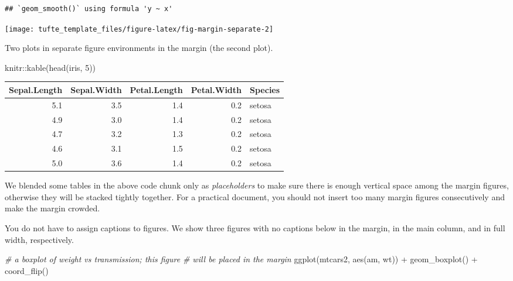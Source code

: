 \documentclass[a4paper,14pt]{tufte-handout}
\newenvironment{Shaded}{}{}
\newcommand{\CommentTok}[1]{\textcolor[rgb]{0.38,0.63,0.69}{\textit{#1}}}
\newcommand{\DecValTok}[1]{\textcolor[rgb]{0.25,0.63,0.44}{#1}}
\newcommand{\FunctionTok}[1]{\textcolor[rgb]{0.02,0.16,0.49}{#1}}
\newcommand{\NormalTok}[1]{#1}
\newcommand{\SpecialCharTok}[1]{\textcolor[rgb]{0.25,0.44,0.63}{#1}}
\begin{document}
\begin{verbatim}
## `geom_smooth()` using formula 'y ~ x'
\end{verbatim}

\begin{marginfigure}

{\centering \texttt{[image: tufte\_template\_files/figure-latex/fig-margin-separate-2]} 

}

\caption[Two plots in separate figure environments in the margin (the second plot)]{Two plots in separate figure environments in the margin (the second plot).}\label{fig:fig-margin-separate-2}
\end{marginfigure}

\begin{Shaded}
\begin{Highlighting}[numbers=left,,]
\NormalTok{knitr}\SpecialCharTok{::}\FunctionTok{kable}\NormalTok{(}\FunctionTok{head}\NormalTok{(iris, }\DecValTok{5}\NormalTok{))}
\end{Highlighting}
\end{Shaded}

\begin{tabular}{r|r|r|r|l}
\hline
Sepal.Length & Sepal.Width & Petal.Length & Petal.Width & Species\\
\hline
5.1 & 3.5 & 1.4 & 0.2 & setosa\\
\hline
4.9 & 3.0 & 1.4 & 0.2 & setosa\\
\hline
4.7 & 3.2 & 1.3 & 0.2 & setosa\\
\hline
4.6 & 3.1 & 1.5 & 0.2 & setosa\\
\hline
5.0 & 3.6 & 1.4 & 0.2 & setosa\\
\hline
\end{tabular}

We blended some tables in the above code chunk only as
\emph{placeholders} to make sure there is enough vertical space among
the margin figures, otherwise they will be stacked tightly together. For
a practical document, you should not insert too many margin figures
consecutively and make the margin crowded.

You do not have to assign captions to figures. We show three figures
with no captions below in the margin, in the main column, and in full
width, respectively.

\begin{Shaded}
\begin{Highlighting}[numbers=left,,]
\CommentTok{\# a boxplot of weight vs transmission; this figure}
\CommentTok{\# will be placed in the margin}
\FunctionTok{ggplot}\NormalTok{(mtcars2, }\FunctionTok{aes}\NormalTok{(am, wt)) }\SpecialCharTok{+} \FunctionTok{geom\_boxplot}\NormalTok{() }\SpecialCharTok{+}
  \FunctionTok{coord\_flip}\NormalTok{()}
\end{Highlighting}
\end{Shaded}
\end{document}

